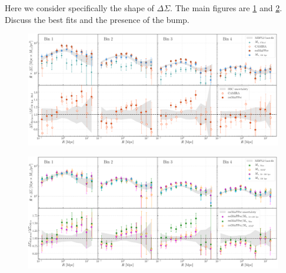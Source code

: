 \documentclass[a4paper,fleqn,usenatbib]{mnras}
\begin{document}
Here we consider specifically the shape of $\Delta\Sigma$. The main figures are \ref{fig:m100} and \ref{fig:mout}. Discuss the best fits and the presence of the bump.

  \begin{figure}
      \centering 
      \includegraphics[width=\textwidth]{fig/small/dsigma_compare_m150_1}
      \caption{
          }
      \label{fig:m100}
  \end{figure}

  \begin{figure}
      \centering
      \includegraphics[width=\textwidth]{fig/small/dsigma_compare_mstars}
      \caption{
          }
      \label{fig:mout}
  \end{figure}
\end{document}
